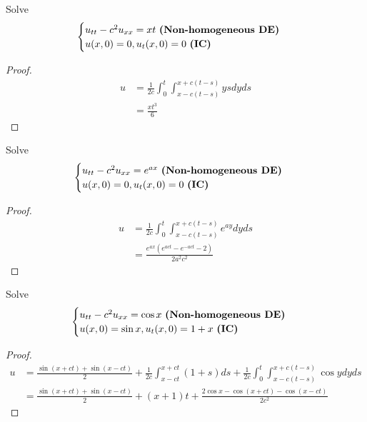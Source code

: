 \documentclass{report}
\begin{document}
\begin{question}{}{}
Solve 
\begin{align*}
\begin{cases}
u_{tt}-c^2u_{xx}=xt\text{ \textbf{(Non-homogeneous DE)} } \\
u(x,0)=0,u_t(x,0)=0\text{ \textbf{(IC)} }
\end{cases}
\end{align*}
\end{question}
\begin{proof}
\begin{align*}
u&=\frac{1}{2c}\int_0^t \int^{x+c(t-s)}_{x-c(t-s)} ysdyds \\
&= \frac{xt^3}{6}
\end{align*}
\end{proof}
\begin{question}{}{}
Solve 
\begin{align*}
\begin{cases}
u_{tt}-c^2u_{xx}=e^{ax}\text{ \textbf{(Non-homogeneous DE)} } \\
u(x,0)=0,u_t(x,0)=0\text{ \textbf{(IC)} }
\end{cases}
\end{align*}
\end{question}
\begin{proof}
\begin{align*}
u&=\frac{1}{2c}\int_0^t \int^{x+c(t-s)}_{x-c(t-s)}e^{ay}dyds \\
&= \frac{e^{ax}(e^{act}-e^{-act}-2)}{2a^2c^2}
\end{align*}
\end{proof}
\begin{question}{}{}
Solve 
\begin{align*}
\begin{cases}
u_{tt}-c^2u_{xx}=\cos x\text{ \textbf{(Non-homogeneous DE)} } \\
u(x,0)=\sin x,u_t(x,0)=1+x\text{ \textbf{(IC)} }
\end{cases}
\end{align*}
\end{question}
\begin{proof}
\begin{align*}
u&= \frac{\sin (x+ct)+\sin (x-ct)}{2}+ \frac{1}{2c}\int_{x-ct}^{x+ct} (1+s)ds + \frac{1}{2c}\int_0^t \int_{x-c(t-s)}^{x+c(t-s)}\cos y dyds \\
&=\frac{\sin (x+ct)+\sin (x-ct)}{2}+(x+1)t + \frac{2\cos x- \cos (x+ct)-\cos (x-ct)}{2c^2}
\end{align*}
\end{proof}
\end{document}
